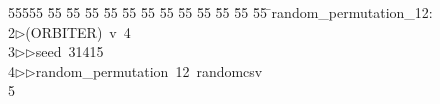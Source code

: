 %
%
\begin{tabbing}
55555 \= 55 \= 55 \= 55 \= 55 \= 55 \= 55 \= 55 \= 55 \= 55 \= 55 \= 55 \= 55 \= \>random\_permutation\_12:\\[0pt]
2\>$\triangleright$\>(ORBITER)\ v\ 4\ \\[0pt]
3\>$\triangleright$\>$\triangleright$\>seed\ 31415\ \\[0pt]
4\>$\triangleright$\>$\triangleright$\>random\_permutation\ 12\ randomcsv\\[0pt]
5\>\end{tabbing}
